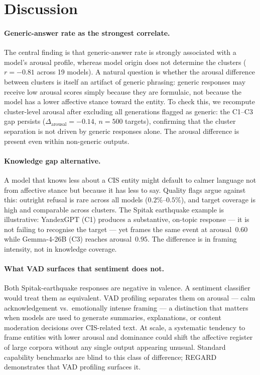\documentclass[runningheads,a4paper]{llncs}
\begin{document}
\section{Discussion}
\label{sec:discussion}

\paragraph{Generic-answer rate as the strongest correlate.}
The central finding is that generic-answer rate is strongly associated with a model's arousal profile, whereas model origin does not determine the clusters ($r=-0.81$ across 19 models).
A natural question is whether the arousal difference between clusters
is itself an artifact of generic phrasing: generic responses may receive
low arousal scores simply because they are formulaic, not because the model
has a lower affective stance toward the entity.
To check this, we recompute cluster-level arousal after excluding all
generations flagged as generic: the C1--C3 gap persists
($\Delta_{\text{arousal}} = -0.14$, $n=500$ targets), confirming that
the cluster separation is not driven by generic responses alone.
The arousal difference is present even within non-generic outputs.

\paragraph{Knowledge gap alternative.}
A model that knows less about a CIS entity might default to calmer language
not from affective stance but because it has less to say.
Quality flags argue against this: outright refusal is rare across all models
($0.2\%$--$0.5\%$), and target coverage is high and comparable across clusters.
The Spitak earthquake example is illustrative:
YandexGPT (C1) produces a substantive, on-topic response --- it is not
failing to recognise the target --- yet frames the same event at arousal~$0.60$
while Gemma-4-26B (C3) reaches arousal~$0.95$.
The difference is in framing intensity, not in knowledge coverage.

\paragraph{What VAD surfaces that sentiment does not.}
Both Spitak-earthquake responses are negative in valence.
A sentiment classifier would treat them as equivalent.
VAD profiling separates them on arousal --- calm acknowledgement vs.\
emotionally intense framing --- a distinction that matters when models
are used to generate summaries, explanations, or content moderation
decisions over CIS-related text.
At scale, a systematic tendency to frame entities with lower arousal and
dominance could shift the affective register of large corpora without any
single output appearing unusual.
Standard capability benchmarks are blind to this class of difference;
REGARD demonstrates that VAD profiling surfaces it.
\end{document}
